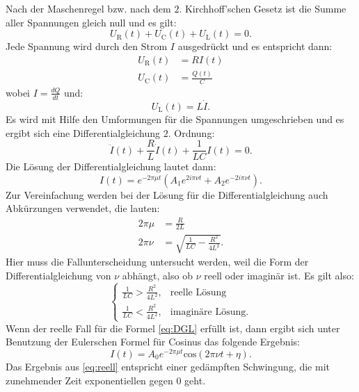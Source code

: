 Nach der Maschenregel bzw. nach dem $2.$ Kirchhoff'schen Gesetz ist die Summe aller Spannungen gleich null und es gilt:
\begin{equation*}
U_{\text{R}}(t) + U_{\text{C}}(t) + U_{\text{L}}(t) = 0.
\end{equation*}
Jede Spannung wird durch den Strom $I$ ausgedrückt und es entspricht dann:
\begin{align*}
U_{\text{R}}(t) &= RI(t) \\
U_{\text{C}}(t) &= \frac{Q(t)}{C}
\end{align*} 
wobei $I = \frac{dQ}{dt}$ und:
\begin{equation*}
U_{\text{L}}(t) = L\dot{I}.
\end{equation*}
Es wird mit Hilfe den Umformungen für die Spannungen umgeschrieben und es ergibt sich eine Differentialgleichung $2.$ Ordnung:
\begin{equation*}
\ddot{I}(t) + \frac{R}{L}\dot{I}(t) + \frac{1}{LC}I(t) = 0.
\end{equation*}
Die Lösung der Differentialgleichung lautet dann:
\begin{equation}
\label{eq:DGL}
I(t) = e^{-2 \pi \mu t}(A_{1}e^{2i \pi \nu t}+A_{2}e^{-2i \pi \nu t}).
\end{equation}
Zur Vereinfachung werden bei der Lösung für die Differentialgleichung auch Abkürzungen verwendet, die lauten:
\begin{align}
\label{eq:Fallunterscheidung}
2 \pi \mu &= \frac{R}{2L} \\
2 \pi \nu &= \sqrt{\frac{1}{LC}-\frac{R^{2}}{4L^{2}}}.
\end{align}
Hier muss die Fallunterscheidung untersucht werden, weil die Form der Differentialgleichung von $\nu$ abhängt, also ob $\nu$ reell oder imaginär ist.
Es gilt also:
\begin{equation*}
\begin{cases}
\frac{1}{LC} > \frac{R^{2}}{4L^{2}}, & \text{reelle Lösung} \\
\frac{1}{LC} < \frac{R^{2}}{4L^{2}}, & \text{imaginäre Lösung}.
\end{cases}
\end{equation*}
Wenn der reelle Fall für die Formel \ref{eq:DGL} erfüllt ist, dann ergibt sich unter Benutzung der Eulerschen Formel für Cosinus das folgende Ergebnis:
\begin{equation}
\label{eq:reell}
I(t) = A_{0}e^{-2\pi\mu t}\text{cos}(2\pi\nu t+\eta).
\end{equation}
Das Ergebnis aus \ref{eq:reell} entspricht einer gedämpften Schwingung, die mit zunehmender Zeit exponentiellen gegen 0 geht. 
